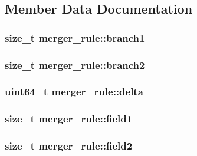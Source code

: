 \subsection{\-Member \-Data \-Documentation}
\hypertarget{structmerger__rule_a7ec6995cf6218808af955a106bb5473e}{
\subsubsection[{branch1}]{\setlength{\rightskip}{0pt plus 5cm}size\-\_\-t {\bf merger\-\_\-rule\-::branch1}}}\label{structmerger__rule_a7ec6995cf6218808af955a106bb5473e}
\hypertarget{structmerger__rule_a6e9234ee65879ba2d503ea13762f737f}{
\subsubsection[{branch2}]{\setlength{\rightskip}{0pt plus 5cm}size\-\_\-t {\bf merger\-\_\-rule\-::branch2}}}\label{structmerger__rule_a6e9234ee65879ba2d503ea13762f737f}
\hypertarget{structmerger__rule_aa8b91c31aed9947f7f462eefd798288e}{
\subsubsection[{delta}]{\setlength{\rightskip}{0pt plus 5cm}uint64\-\_\-t {\bf merger\-\_\-rule\-::delta}}}\label{structmerger__rule_aa8b91c31aed9947f7f462eefd798288e}
\hypertarget{structmerger__rule_a75ff8ca454374332c6b08bb8eb281f87}{
\subsubsection[{field1}]{\setlength{\rightskip}{0pt plus 5cm}size\-\_\-t {\bf merger\-\_\-rule\-::field1}}}\label{structmerger__rule_a75ff8ca454374332c6b08bb8eb281f87}
\hypertarget{structmerger__rule_aa3485e9c1ea5728822474c3128d8c650}{
\subsubsection[{field2}]{\setlength{\rightskip}{0pt plus 5cm}size\-\_\-t {\bf merger\-\_\-rule\-::field2}}}\label{structmerger__rule_aa3485e9c1ea5728822474c3128d8c650}
